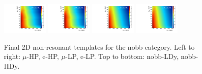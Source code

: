 \begin{figure}[htbp]
  \includegraphics[width=0.2\textwidth]{fig/2Dfit/template_nonRes_mu_HP_nobb_HDy.pdf}
  \includegraphics[width=0.2\textwidth]{fig/2Dfit/template_nonRes_e_HP_nobb_HDy.pdf}
  \includegraphics[width=0.2\textwidth]{fig/2Dfit/template_nonRes_mu_LP_nobb_HDy.pdf}
  \includegraphics[width=0.2\textwidth]{fig/2Dfit/template_nonRes_e_LP_nobb_HDy.pdf}\\
  \caption{
    Final 2D non-resonant templates for the nobb category.
    Left to right: $\mu$-HP, e-HP, $\mu$-LP, e-LP.
    Top to bottom: nobb-LDy, nobb-HDy.
  }
  \label{fig:templates_nonRes_Run2}
\end{figure}

